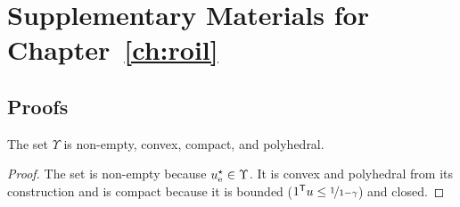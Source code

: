 \chapter{Supplementary Materials for \texorpdfstring{Chapter~\ref{ch:roil}}{Chapter 3}}\label{app:roil}

\section{Proofs} %
\label{sec:appendix_proofs}
\begin{lemma}\label{prop:convexity_of_Upsilon}
The set $\Upsilon$ is non-empty, convex, compact, and polyhedral.
\end{lemma}
\begin{proof}
The set is non-empty because $u_{\mathrm{e}}^{\star}  \in \Upsilon$. It is convex and polyhedral from its construction and is compact because it is bounded ($1^{\mathsf{T}} u \le  \nicefrac{1}{1-\gamma}$) and closed.  
\end{proof}

